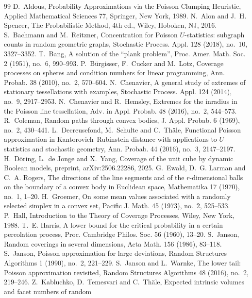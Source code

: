 \documentclass[11pt]{article}
\begin{document}
\begin{thebibliography}{99}
 D.~Aldous, Probability Approximations via the Poisson Clumping Heuristic, Applied Mathematical Sciences
77, Springer, New York, 1989.
 N.~Alon and J.~H. Spencer, The Probabilistic Method, 4th ed., Wiley, Hoboken, NJ, 2016.
 S.~Bachmann and M.~Reitzner, Concentration for Poisson $U$-statistics: subgraph counts in random geometric
graphs, Stochastic Process. Appl. 128 (2018), no.~10, 3327--3352.
 T.~Bang, A solution of the ``plank problem'', Proc. Amer. Math. Soc. 2 (1951), no.~6, 990--993.
 P.~B\"urgisser, F.~Cucker and M.~Lotz, Coverage processes on spheres and condition numbers for linear
programming, Ann. Probab. 38 (2010), no.~2, 570--604.
 N.~Chenavier, A general study of extremes of stationary tessellations with examples, Stochastic
Process. Appl. 124 (2014), no.~9, 2917--2953.
 N.~Chenavier and R.~Hemsley, Extremes for the inradius in the Poisson line tessellation, Adv. in Appl.
Probab. 48 (2016), no.~2, 544--573.
 R.~Coleman, Random paths through convex bodies, J. Appl. Probab. 6 (1969), no.~2, 430--441.
 L.~Decreusefond, M.~Schulte and C.~Th\"ale, Functional Poisson approximation in Kantorovich--Rubinstein
distance with applications to $U$-statistics and stochastic geometry, Ann. Probab. 44 (2016), no.~3, 2147--2197.
 H.~D\"oring, L.~de Jonge and X.~Yang, Coverage of the unit cube by dynamic Boolean models, preprint,
arXiv:2506.22286, 2025.
 G.~Ewald, D.~G. Larman and C.~A. Rogers, The directions of the line segments and of the $r$-dimensional balls on
the boundary of a convex body in Euclidean space, Mathematika 17 (1970), no.~1, 1--20.
 H.~Groemer, On some mean values associated with a randomly selected simplex in a convex set, Pacific J.
Math. 45 (1973), no.~2, 525--533.
 P.~Hall, Introduction to the Theory of Coverage Processes, Wiley, New York, 1988.
 T.~E. Harris, A lower bound for the critical probability in a certain percolation
process, Proc. Cambridge Philos. Soc. 56 (1960), 13--20.
 S.~Janson, Random coverings in several dimensions, Acta Math. 156 (1986), 83--118.
 S.~Janson, Poisson approximation for large deviations, Random Structures Algorithms 1
(1990), no.~2, 221--229.
 S.~Janson and L.~Warnke, The lower tail: Poisson approximation revisited, Random Structures Algorithms 48
(2016), no.~2, 219--246.
 Z.~Kabluchko, D.~Temesvari and C.~Th\"ale, Expected intrinsic volumes and facet numbers of random

\end{thebibliography}
\end{document}
